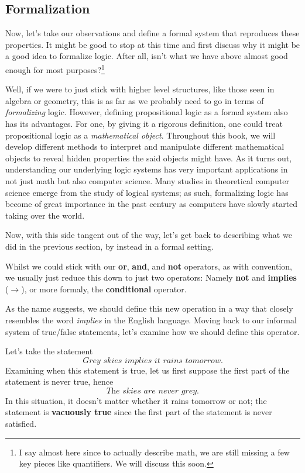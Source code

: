 \subsection{Formalization}
Now, let's take our observations and define a formal system that reproduces these properties.
It might be good to stop at this time and first discuss why it might be a good idea to formalize logic.
After all, isn't what we have above almost good enough for most purposes?\footnote{
I say almost here since to actually describe math, we are still missing a few key pieces like quantifiers. We will discuss this soon.}

Well, if we were to just stick with higher level structures,  like those seen in algebra or geometry, this is as far as we probably need to go in terms of \textit{formalizing} logic.
However, defining propositional logic as a formal system also has its advantages.
For one, by giving it a rigorous definition, one could treat propositional logic as a \textit{mathematical object}.
Throughout this book, we will develop different methods to interpret and manipulate different mathematical objects to reveal hidden properties the said objects might have.
As it turns out, understanding our underlying logic systems has very important applications in not just math but also computer science.
Many studies in theoretical computer science emerge from the study of logical systems; as such, formalizing logic has become of great importance in the past century as computers have slowly started taking over the world.

Now, with this side tangent out of the way, let's get back to describing what we did in the previous section, by instead in a formal setting.

Whilst we could stick with our \textbf{or}, \textbf{and}, and \textbf{not} operators, as with convention, we usually just reduce this down to just two operators: Namely \textbf{not} and \textbf{implies} ($\to$), or more formaly, the \textbf{conditional} operator.

As the name suggests, we should define this new operation in a way that closely resembles the word \textit{implies} in the English language.
Moving back to our informal system of true/false statements, let's examine how we should define this operator.

Let's take the statement
$$\textit{Grey skies implies it rains tomorrow}.$$
Examining when this statement is true, let us first suppose the first part of the statement is never true, hence
$$\textit{The skies are never grey}.$$
In this situation, it doesn't matter whether it rains tomorrow or not; the statement is \textbf{vacuously true} since the first part of the statement is never satisfied.

